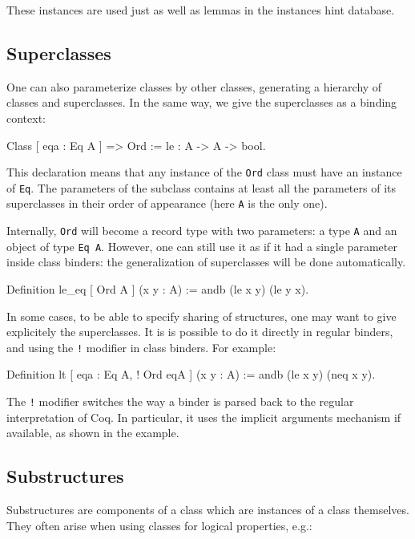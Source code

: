 These instances are used just as well as lemmas in the instances hint database.


\subsection{Superclasses}
One can also parameterize classes by other classes, generating a
hierarchy of classes and superclasses. In the same way, we give the
superclasses as a binding context:

\begin{coq_example}
Class [ eqa : Eq A ] => Ord :=
  le : A -> A -> bool.
\end{coq_example}

This declaration means that any instance of the \texttt{Ord} class must
have an instance of \texttt{Eq}. The parameters of the subclass contains
at least all the parameters of its superclasses in their order of
appearance (here \texttt{A} is the only one). 

Internally, \texttt{Ord} will become a record type with two parameters:
a type \texttt{A} and an object of type \texttt{Eq A}. However, one can
still use it as if it had a single parameter inside class binders: the
generalization of superclasses will be done automatically. 
\begin{coq_example}
Definition le_eq [ Ord A ] (x y : A) :=
  andb (le x y) (le y x).
\end{coq_example}

In some cases, to be able to specify sharing of structures, one may want to give
explicitely the superclasses. It is is possible to do it directly in regular
binders, and using the \texttt{!} modifier in class binders. For
example:

\begin{coq_example*}
Definition lt [ eqa : Eq A, ! Ord eqA ] (x y : A) :=
  andb (le x y) (neq x y).
\end{coq_example*}

The \texttt{!} modifier switches the way a binder is parsed back to the
regular interpretation of Coq. In particular, it uses the implicit
arguments mechanism if available, as shown in the example.

\subsection{Substructures}

Substructures are components of a class which are instances of a class
themselves. They often arise when using classes for logical properties,
e.g.:

